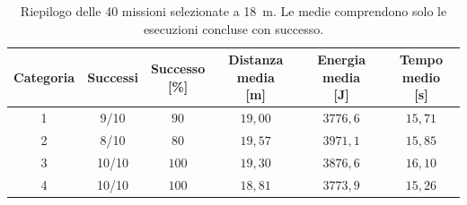 \begin{table}[H]
\centering
\caption{Riepilogo delle 40 missioni selezionate a 18~m. Le medie comprendono solo le esecuzioni concluse con successo.}
\label{tab:big-map-18m-statistiche}
\small
\setlength{\tabcolsep}{5pt}
\begin{tabular}{@{}cccccc@{}}
\toprule
Categoria & Successi & \shortstack{Successo\\{}[\%]} & \shortstack{Distanza media\\{}[m]} & \shortstack{Energia media\\{}[J]} & \shortstack{Tempo medio\\{}[s]} \\
\midrule
1 & 9/10 & $90$ & $19{,}00$ & $3776{,}6$ & $15{,}71$ \\
2 & 8/10 & $80$ & $19{,}57$ & $3971{,}1$ & $15{,}85$ \\
3 & 10/10 & $100$ & $19{,}30$ & $3876{,}6$ & $16{,}10$ \\
4 & 10/10 & $100$ & $18{,}81$ & $3773{,}9$ & $15{,}26$ \\
\bottomrule
\end{tabular}
\end{table}
